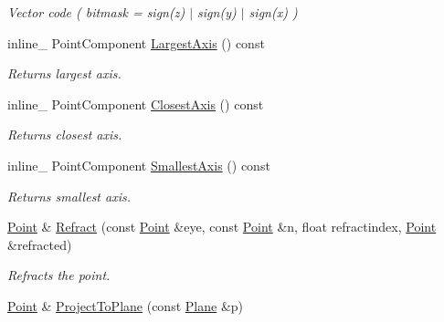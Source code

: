\begin{DoxyCompactItemize}
\begin{DoxyCompactList}\small\item\em Vector code ( bitmask = sign(z) $\vert$ sign(y) $\vert$ sign(x) ) \end{DoxyCompactList}\item 
\hypertarget{class_point_a341eeb6f9f8fc6c0cab95e4dc2b88311}{inline\+\_\+ Point\+Component \hyperlink{class_point_a341eeb6f9f8fc6c0cab95e4dc2b88311}{Largest\+Axis} () const }\label{class_point_a341eeb6f9f8fc6c0cab95e4dc2b88311}

\begin{DoxyCompactList}\small\item\em Returns largest axis. \end{DoxyCompactList}\item 
\hypertarget{class_point_a4bbe08fc9dd5b8a8082cdbed13fc9988}{inline\+\_\+ Point\+Component \hyperlink{class_point_a4bbe08fc9dd5b8a8082cdbed13fc9988}{Closest\+Axis} () const }\label{class_point_a4bbe08fc9dd5b8a8082cdbed13fc9988}

\begin{DoxyCompactList}\small\item\em Returns closest axis. \end{DoxyCompactList}\item 
\hypertarget{class_point_ab67cfc65c221a517c6c28321c6cb8b3c}{inline\+\_\+ Point\+Component \hyperlink{class_point_ab67cfc65c221a517c6c28321c6cb8b3c}{Smallest\+Axis} () const }\label{class_point_ab67cfc65c221a517c6c28321c6cb8b3c}

\begin{DoxyCompactList}\small\item\em Returns smallest axis. \end{DoxyCompactList}\item 
\hypertarget{class_point_a3bcdc1e2ed3aaed2b2c1f894e8d9f7c3}{\hyperlink{class_point}{Point} \& \hyperlink{class_point_a3bcdc1e2ed3aaed2b2c1f894e8d9f7c3}{Refract} (const \hyperlink{class_point}{Point} \&eye, const \hyperlink{class_point}{Point} \&n, float refractindex, \hyperlink{class_point}{Point} \&refracted)}\label{class_point_a3bcdc1e2ed3aaed2b2c1f894e8d9f7c3}

\begin{DoxyCompactList}\small\item\em Refracts the point. \end{DoxyCompactList}\item 
\hypertarget{class_point_a199cc7d23f441cb5b4b2c26f019eda07}{\hyperlink{class_point}{Point} \& \hyperlink{class_point_a199cc7d23f441cb5b4b2c26f019eda07}{Project\+To\+Plane} (const \hyperlink{class_plane}{Plane} \&p)}\label{class_point_a199cc7d23f441cb5b4b2c26f019eda07}


\end{DoxyCompactItemize}
